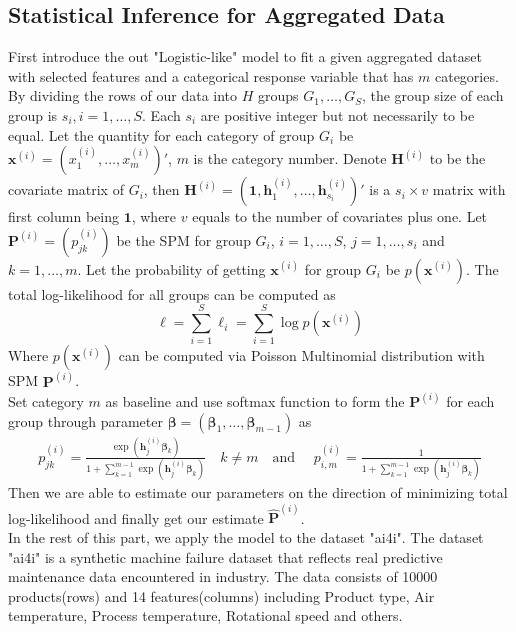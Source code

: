 \documentclass[12pt]{article}
\newcommand{\Pmat}{\mathbf{P}}
\newcommand{\wh}{\widehat}
\begin{document}
\subsection{Statistical Inference for Aggregated Data}\label{sec:model.est.inf}	
First introduce the out "Logistic-like" model to fit a given aggregated dataset with selected features and a categorical response variable that has $m$ categories. By dividing the rows of our data into $H$ groups $G_1,\dots,G_{S}$, the group size of each group is $s_i,i=1,\dots,S$. Each $s_i$ are positive integer but not necessarily to be equal. Let the quantity for each category of group $G_i$ be $\boldsymbol{x}^{(i)} = (x_1^{(i)}, \dots, x_m^{(i)})'$, $m$ is the category number. Denote $\boldsymbol{H}^{(i)}$ to be the covariate matrix of $G_i$, then $\boldsymbol{H}^{(i)} = (\boldsymbol{1}, \boldsymbol{h}_{1}^{(i)},\dots,\boldsymbol{h}_{s_i}^{(i)})'$ is a $s_i \times v$ matrix with first column being $\boldsymbol{1}$, where $v$ equals to the number of covariates plus one. Let $\Pmat^{(i)} = (p_{jk}^{(i)})$ be the SPM for group $G_i$, $i = 1, \dots, S$, $j = 1,\dots ,s_i$ and $k = 1,\dots, m$. Let the probability of getting $\boldsymbol{x}^{(i)}$ for group $G_i$ be $p(\boldsymbol{x}^{(i)})$. The total log-likelihood for all groups can be computed as
\begin{equation*}
    \ell = \sum_{i=1}^{S}\ell_i = \sum_{i=1}^{S}\log p(\boldsymbol{x}^{(i)})
\end{equation*}
Where $p(\boldsymbol{x}^{(i)})$ can be computed via Poisson Multinomial distribution with SPM $\Pmat^{(i)}$.\\
Set category $m$ as baseline and use softmax function to form the $\Pmat^{(i)}$ for each group through parameter $\boldsymbol{\beta} = (\boldsymbol{\beta}_1, \dots, \boldsymbol{\beta}_{m-1})$ as
\begin{align*}
    p_{j k}^{(i)} = \frac{\exp{\left(\boldsymbol{h}_{j}^{(i)} \boldsymbol{\beta}_{k}\right)}}{1 + \sum_{k=1}^{m-1}\exp{\left( \boldsymbol{h}_{j}^{(i)} \boldsymbol{\beta}_{k} \right)}}
    \quad k \neq m \quad \text{and } \quad
    p_{i,m}^{(i)} = \frac{1}{1 + \sum_{k=1}^{m-1}\exp{\left( \boldsymbol{h}_{j}^{(i)} \boldsymbol{\beta}_{k} \right)}}
\end{align*}
Then we are able to estimate our parameters on the direction of minimizing total log-likelihood and finally get our estimate $\wh{\Pmat}^{(i)}$. \\
In the rest of this part, we apply the model to the dataset "ai4i". The dataset "ai4i" is a synthetic machine failure dataset that reflects real predictive maintenance data encountered in industry. The data consists of 10000 products(rows) and 14 features(columns) including Product type, Air temperature, Process temperature, Rotational speed and others.\\
\end{document}
